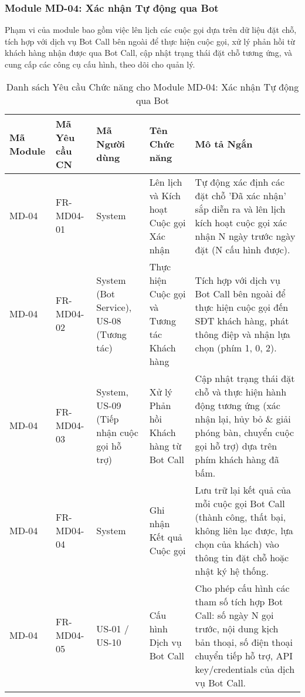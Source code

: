\subsubsection{Module MD-04: Xác nhận Tự động qua Bot}
Phạm vi của module bao gồm việc lên lịch các cuộc gọi dựa trên dữ liệu đặt chỗ, tích hợp với dịch vụ Bot Call bên ngoài để thực hiện cuộc gọi, xử lý phản hồi từ khách hàng nhận được qua Bot Call, cập nhật trạng thái đặt chỗ tương ứng, và cung cấp các công cụ cấu hình, theo dõi cho quản lý.


\begin{longtable}{|m{2cm}|m{2.5cm}|m{2.5cm}|m{4.5cm}|m{3.5cm}|}
\caption{Danh sách Yêu cầu Chức năng cho Module MD-04: Xác nhận Tự động qua Bot} \label{tab:fr_md04} \\
\hline
\textbf{Mã Module} & \textbf{Mã Yêu cầu CN} & \textbf{Mã Người dùng} & \textbf{Tên Chức năng} & \textbf{Mô tả Ngắn} \\
\hline
\endhead %

\hline
\endfoot %

\hline
\endlastfoot %

MD-04 & FR-MD04-01 & System & Lên lịch và Kích hoạt Cuộc gọi Xác nhận & Tự động xác định các đặt chỗ 'Đã xác nhận' sắp diễn ra và lên lịch kích hoạt cuộc gọi xác nhận N ngày trước ngày đặt (N cấu hình được). \\
\hline
MD-04 & FR-MD04-02 & System (Bot Service), US-08 (Tương tác) & Thực hiện Cuộc gọi và Tương tác Khách hàng & Tích hợp với dịch vụ Bot Call bên ngoài để thực hiện cuộc gọi đến SĐT khách hàng, phát thông điệp và nhận lựa chọn (phím 1, 0, 2). \\
\hline
MD-04 & FR-MD04-03 & System, US-09 (Tiếp nhận cuộc gọi hỗ trợ) & Xử lý Phản hồi Khách hàng từ Bot Call & Cập nhật trạng thái đặt chỗ và thực hiện hành động tương ứng (xác nhận lại, hủy bỏ \& giải phóng bàn, chuyển cuộc gọi hỗ trợ) dựa trên phím khách hàng đã bấm. \\
\hline
MD-04 & FR-MD04-04 & System & Ghi nhận Kết quả Cuộc gọi & Lưu trữ lại kết quả của mỗi cuộc gọi Bot Call (thành công, thất bại, không liên lạc được, lựa chọn của khách) vào thông tin đặt chỗ hoặc nhật ký hệ thống. \\
\hline
MD-04 & FR-MD04-05 & US-01 / US-10 & Cấu hình Dịch vụ Bot Call & Cho phép cấu hình các tham số tích hợp Bot Call: số ngày N gọi trước, nội dung kịch bản thoại, số điện thoại chuyển tiếp hỗ trợ, API key/credentials của dịch vụ Bot Call. \\
\hline

\end{longtable}

